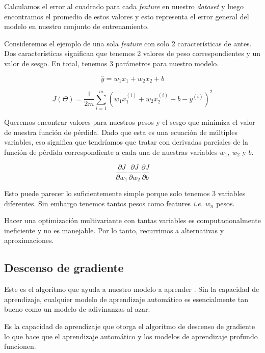 \documentclass[14.5pt,a4paper]{article}
\begin{document}
Calculamos el error al cuadrado para cada \textit{feature} en nuestro \textit{dataset} y luego encontramos el promedio de estos valores y esto representa el error general del modelo en nuestro conjunto de entrenamiento.

Consideremos el ejemplo de una sola \textit{feature} con solo 2 características de antes. Dos características significan que tenemos 2 valores de peso correspondientes y un valor de sesgo. En total, tenemos 3 parámetros para nuestro modelo.

\begin{equation}
\hat{y} = w_1x_1 + w_2x_2 + b
\end{equation}

\begin{equation}
J(\Theta)=\frac{1}{2m} \sum_{i=1}^{m} (w_1x_1^{(i)}+w_2x_2^{(i)}+b-y^{(i)})^2
\end{equation}

Queremos encontrar valores para nuestros pesos y el sesgo que minimiza el valor de nuestra función de pérdida. Dado que esta es una ecuación de múltiples variables, eso significa que tendríamos que tratar con derivadas parciales de la función de pérdida correspondiente a cada una de nuestras variables $w_1$, $w_2$ y $b$.

\begin{equation}
\frac{\partial J}{\partial w_1} \frac{\partial J}{\partial w_2}
\frac{\partial J}{\partial b}
\end{equation}

Esto puede parecer lo suficientemente simple porque solo tenemos 3 variables diferentes.
Sin embargo tenemos tantos pesos como features \textit{i.e.} $w_n$ pesos.

Hacer una optimización multivariante con tantas variables es computacionalmente ineficiente y no es manejable. Por lo tanto, recurrimos a alternativas y aproximaciones.

\subsection{Descenso de gradiente}
Este es el algoritmo que ayuda a nuestro modelo a aprender . Sin la capacidad de aprendizaje, cualquier modelo de aprendizaje automático es esencialmente tan bueno como un modelo de adivinanzas al azar.

Es la capacidad de aprendizaje que otorga el algoritmo de descenso de gradiente lo que hace que el aprendizaje automático y los modelos de aprendizaje profundo funcionen.
\end{document}
